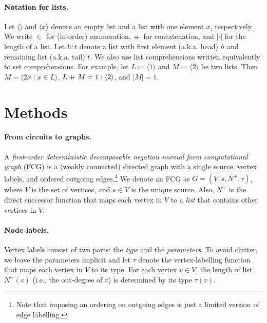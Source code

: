 \paragraph{Notation for lists.}
Let $\langle\rangle$ and $\langle x \rangle$ denote an empty list and a list
with one element $x$, respectively. We write $\in$ for (in-order) enumeration,
$\mathbin{+\mkern-10mu+}$ for concatenation, and $|\cdot|$ for the length of a list. Let
$h : t$ denote a list with first element (a.k.a. head) $h$ and remaining list
(a.k.a. tail) $t$. We also use list comprehensions written equivalently to set
comprehensions. For example, let $L \coloneqq \langle 1 \rangle$ and
$M \coloneqq \langle 2 \rangle$ be two lists. Then
$M = \langle 2x \mid x \in L \rangle$,
$L \mathbin{+\mkern-10mu+} M = 1 : \langle 2 \rangle$, and $|M| = 1$.

\section{Methods}



\paragraph{From circuits to graphs.}
A \emph{first-order deterministic decomposable negation normal form
  computational graph} (FCG) is a (weakly connected) directed graph with a
single source, vertex labels, and ordered outgoing edges.\footnote{Note that
  imposing an ordering on outgoing edges is just a limited version of edge
  labelling.} We denote an FCG as $G = (V, s, N^+, \tau)$, where $V$ is the set
of vertices, and $s \in V$ is the unique source. Also, $N^+$ is the direct
successor function that maps each vertex in $V$ to a \emph{list} that contains
other vertices in $V$.

\paragraph{Node labels.}
Vertex labels consist of two parts: the \emph{type} and the \emph{parameters}.
To avoid clutter, we leave the parameters implicit and let $\tau$ denote the
vertex-labelling function that maps each vertex in $V$ to its type. For each
vertex $v \in V$, the length of list $N^+(v)$ (i.e., the out-degree of $v$) is
determined by its type $\tau(v)$.

